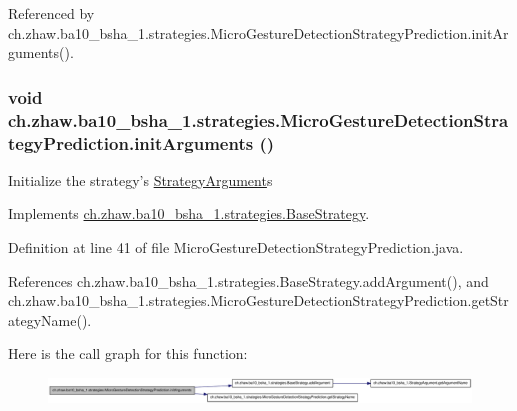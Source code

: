 Referenced by ch.zhaw.ba10\_\-bsha\_\-1.strategies.MicroGestureDetectionStrategyPrediction.initArguments().\hypertarget{classch_1_1zhaw_1_1ba10__bsha__1_1_1strategies_1_1MicroGestureDetectionStrategyPrediction_a2ea70a5b663ee8417635fa4432e0acf6}{
\subsubsection[{initArguments}]{\setlength{\rightskip}{0pt plus 5cm}void ch.zhaw.ba10\_\-bsha\_\-1.strategies.MicroGestureDetectionStrategyPrediction.initArguments ()}}
\label{classch_1_1zhaw_1_1ba10__bsha__1_1_1strategies_1_1MicroGestureDetectionStrategyPrediction_a2ea70a5b663ee8417635fa4432e0acf6}
Initialize the strategy's \hyperlink{classch_1_1zhaw_1_1ba10__bsha__1_1_1StrategyArgument}{StrategyArgument}s 

Implements \hyperlink{classch_1_1zhaw_1_1ba10__bsha__1_1_1strategies_1_1BaseStrategy_a0496e8fd0099a5f0f7765322d7e752a9}{ch.zhaw.ba10\_\-bsha\_\-1.strategies.BaseStrategy}.

Definition at line 41 of file MicroGestureDetectionStrategyPrediction.java.

References ch.zhaw.ba10\_\-bsha\_\-1.strategies.BaseStrategy.addArgument(), and ch.zhaw.ba10\_\-bsha\_\-1.strategies.MicroGestureDetectionStrategyPrediction.getStrategyName().

Here is the call graph for this function:\nopagebreak
\begin{figure}[H]
\begin{center}
\leavevmode
\includegraphics[width=420pt]{classch_1_1zhaw_1_1ba10__bsha__1_1_1strategies_1_1MicroGestureDetectionStrategyPrediction_a2ea70a5b663ee8417635fa4432e0acf6_cgraph}
\end{center}
\end{figure}


